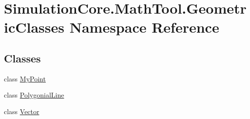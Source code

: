 \hypertarget{namespace_simulation_core_1_1_math_tool_1_1_geometric_classes}{}\section{Simulation\+Core.\+Math\+Tool.\+Geometric\+Classes Namespace Reference}
\label{namespace_simulation_core_1_1_math_tool_1_1_geometric_classes}
\subsection*{Classes}
\begin{DoxyCompactItemize}
\item 
class \hyperlink{class_simulation_core_1_1_math_tool_1_1_geometric_classes_1_1_my_point}{My\+Point}
\item 
class \hyperlink{class_simulation_core_1_1_math_tool_1_1_geometric_classes_1_1_polygonial_line}{Polygonial\+Line}
\item 
class \hyperlink{class_simulation_core_1_1_math_tool_1_1_geometric_classes_1_1_vector}{Vector}
\end{DoxyCompactItemize}

